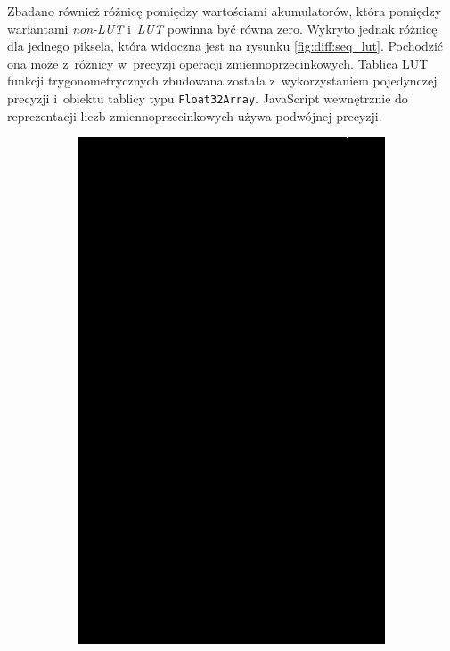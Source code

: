 Zbadano również różnicę pomiędzy wartościami akumulatorów, która pomiędzy wariantami \textit{non-LUT} i~\textit{LUT} powinna być równa zero. Wykryto jednak różnicę dla jednego piksela, która widoczna jest na rysunku \ref{fig:diff:seq_lut}. Pochodzić ona może z~różnicy w~precyzji operacji zmiennoprzecinkowych. Tablica LUT funkcji trygonometrycznych zbudowana została z~wykorzystaniem pojedynczej precyzji i~obiektu tablicy typu \lstinline{Float32Array}. JavaScript wewnętrznie do reprezentacji liczb zmiennoprzecinkowych używa podwójnej precyzji.



\begin{figure}[h]
    \begin{subfigure}{0.3\textwidth}
        \includegraphics[width=\linewidth] {../../packages/js-benchmarks/img/diff_seq_seq_lookup.png}

\end{subfigure}
\end{figure}
